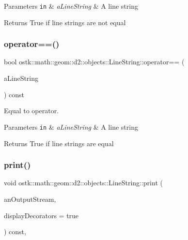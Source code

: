 \begin{DoxyParams}[1]{Parameters}
\mbox{\tt in}  & {\em a\+Line\+String} & A line string \\
\hline
\end{DoxyParams}
\begin{DoxyReturn}{Returns}
True if line strings are not equal 
\end{DoxyReturn}
\mbox{\label{classostk_1_1math_1_1geom_1_1d2_1_1objects_1_1_line_string_ae01ac82c204c56b000f9d531f713c1d1}} 
\subsubsection{\texorpdfstring{operator==()}{operator==()}}
{\footnotesize\ttfamily bool ostk\+::math\+::geom\+::d2\+::objects\+::\+Line\+String\+::operator== (\begin{DoxyParamCaption}\item[{const \hyperlink{classostk_1_1math_1_1geom_1_1d2_1_1objects_1_1_line_string}{Line\+String} \&}]{a\+Line\+String }\end{DoxyParamCaption}) const}



Equal to operator. 


\begin{DoxyParams}[1]{Parameters}
\mbox{\tt in}  & {\em a\+Line\+String} & A line string \\
\hline
\end{DoxyParams}
\begin{DoxyReturn}{Returns}
True if line strings are equal 
\end{DoxyReturn}
\mbox{\label{classostk_1_1math_1_1geom_1_1d2_1_1objects_1_1_line_string_afcdaa3f11f0bd830af0311392c7e9e26}} 
\subsubsection{\texorpdfstring{print()}{print()}}
{\footnotesize\ttfamily void ostk\+::math\+::geom\+::d2\+::objects\+::\+Line\+String\+::print (\begin{DoxyParamCaption}\item[{std\+::ostream \&}]{an\+Output\+Stream,  }\item[{bool}]{display\+Decorators = {\ttfamily true} }\end{DoxyParamCaption}) const\hspace{0.3cm}{\ttfamily [override]}, {\ttfamily [virtual]}}



